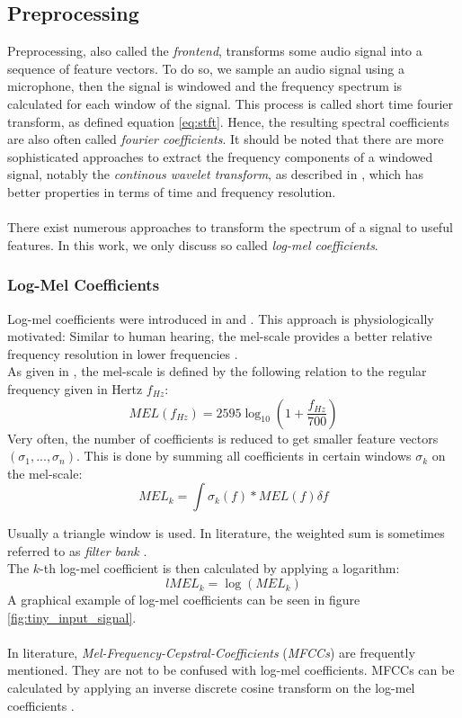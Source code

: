 \subsection{Preprocessing}
Preprocessing, also called the \textit{frontend}, transforms some audio signal into a sequence of feature vectors. To do so, we sample an audio signal using a microphone, then the signal is windowed and the frequency spectrum is calculated for each window of the signal. This process is called short time fourier transform, as defined equation \ref{eq:stft}. Hence, the resulting spectral coefficients are also often called \textit{fourier coefficients}. It should be noted that there are more sophisticated approaches to extract the frequency components of a windowed signal, notably the \textit{continous wavelet transform}, as described in \cite{mallat1999wavelet}, which has better properties in terms of time and frequency resolution. \\ \\
There exist numerous approaches to transform the spectrum of a signal to useful features. In this work, we only discuss so called \textit{log-mel coefficients}. 
\subsubsection{Log-Mel Coefficients}
\label{sec:lmel}
Log-mel coefficients were introduced in \cite{waibel1990phoneme} and \cite{waibel1983comparative}. This approach is physiologically motivated: Similar to human hearing, the mel-scale provides a better relative frequency resolution in lower frequencies \cite{waibel1990phoneme}. \\
As given in \cite{poser1990speech}, the mel-scale is defined by the following relation to the regular frequency given in Hertz $f_{Hz}$: 
\[
MEL(f_{Hz})=2595\log _{10}\left(1+{\frac {f_{Hz}}{700}}\right)
\]
Very often, the number of coefficients is reduced to get smaller feature vectors $(\sigma_1, ..., \sigma_n)$. This is done by summing all coefficients in certain windows $\sigma_k$ on the mel-scale: 
\[
MEL_k = \int \sigma_k(f) * MEL(f) \delta f 
\]

Usually a triangle window is used. In literature, the weighted sum is sometimes referred to as \textit{filter bank} \cite{zhan1997vocal}. \\
The $k$-th log-mel coefficient is then calculated by applying a logarithm:
\[
lMEL_k = \log(MEL_k) 
\]
A graphical example of log-mel coefficients can be seen in figure \ref{fig:tiny_input_signal}.
\\ \\
In literature, \textit{Mel-Frequency-Cepstral-Coefficients} (\textit{MFCCs}) are frequently mentioned. They are not to be confused with log-mel coefficients. MFCCs can be calculated by applying an inverse discrete cosine transform on the log-mel coefficients \cite{davis1990comparison}.


